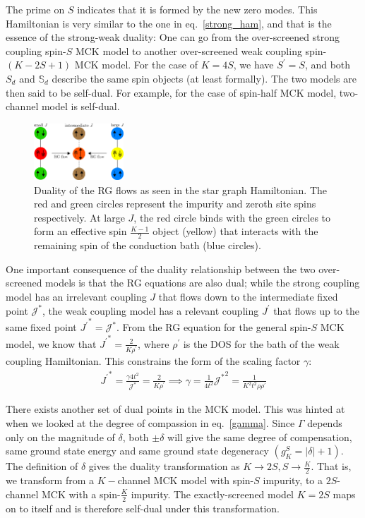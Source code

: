 \documentclass[reprint,prb,superscriptaddress]{revtex4-1}
\begin{document}
The prime on \(S\) indicates that it is formed by the new zero modes. This Hamiltonian is very similar to the one in eq.~\ref{strong_ham}, and that is the essence of the strong-weak duality: One can go from the over-screened strong coupling spin-\(S\) MCK model to another over-screened weak coupling spin-\((K-2S+1)\) MCK model. For the case of \(K=4S\), we have \(S^\prime = S\), and both \(S_d\) and \(\mathbb{S}_d\) describe the same spin objects (at least formally). The two models are then said to be self-dual. For example, for the case of spin-half MCK model, two-channel model is self-dual.
\begin{figure}[!htpb]
	\centering
	\includegraphics[width=0.3\textwidth]{plt/duality.pdf}
	\caption{Duality of the RG flows as seen in the star graph Hamiltonian. The red and green circles represent the impurity and zeroth site spins respectively. At large \(J\), the red circle binds with the green circles to form an effective spin \(\frac{K-1}{2}\) object (yellow) that interacts with the remaining spin of the conduction bath (blue circles).}
	\label{duality_fig}
\end{figure}

One important consequence of the duality relationship between the two over-screened models is that the RG equations are also dual; while the strong coupling model has an irrelevant coupling \(J\) that flows down to the intermediate fixed point \({\mathcal{J}^*}\), the weak coupling model has a relevant coupling \(J^\prime\) that flows up to the same fixed point \({J^\prime}^* = {\mathcal{J}^*}\). From the RG equation for the general spin-\(S\) MCK model, we know that \({J^\prime}^* = \frac{2}{K \rho^\prime}\), where \(\rho^\prime\) is the DOS for the bath of the weak coupling Hamiltonian. This constrains the form of the scaling factor \(\gamma\):
\begin{equation}\begin{aligned}
	{J^\prime}^* = \frac{\gamma 4t^2}{{\mathcal{J}^*}} = \frac{2}{K \rho^\prime} \implies \gamma = \frac{1}{4t^2} {{\mathcal{J}^*}}^2 = \frac{1}{K^2 t^2 \rho \rho^\prime}
\end{aligned}\end{equation}

There exists another set of dual points in the MCK model. This was hinted at when we looked at the degree of compassion in eq.~\ref{gamma}. Since \(\Gamma\) depends only on the magnitude of \(\delta\), both \(\pm \delta\) will give the same degree of compensation, same ground state energy and same ground state degeneracy \(\left(g^S_K = |\delta|+1\right)\). The definition of \(\delta\) gives the duality transformation as \(K \to 2S, S \to \frac{K}{2}\). That is, we transform from a \(K-\)channel MCK model with spin-\(S\) impurity, to a \(2S\)-channel MCK with a spin-\(\frac{K}{2}\) impurity. The exactly-screened model \(K=2S\) maps on to itself and is therefore self-dual under this transformation.
\end{document}

